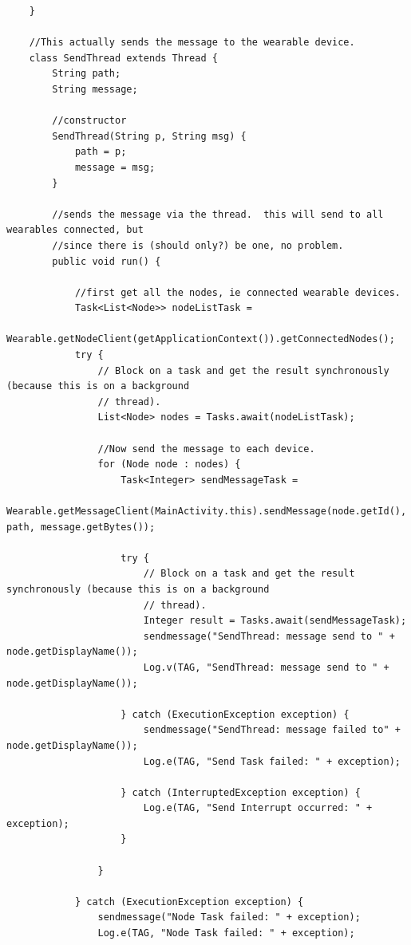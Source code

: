 \documentclass[12pt]{book}
\numberwithin{equation}{section}
\begin{document}
\begin{appendices}
\begin{verbatim}
    }

    //This actually sends the message to the wearable device.
    class SendThread extends Thread {
        String path;
        String message;

        //constructor
        SendThread(String p, String msg) {
            path = p;
            message = msg;
        }

        //sends the message via the thread.  this will send to all wearables connected, but
        //since there is (should only?) be one, no problem.
        public void run() {

            //first get all the nodes, ie connected wearable devices.
            Task<List<Node>> nodeListTask =
                    Wearable.getNodeClient(getApplicationContext()).getConnectedNodes();
            try {
                // Block on a task and get the result synchronously (because this is on a background
                // thread).
                List<Node> nodes = Tasks.await(nodeListTask);

                //Now send the message to each device.
                for (Node node : nodes) {
                    Task<Integer> sendMessageTask =
                            Wearable.getMessageClient(MainActivity.this).sendMessage(node.getId(), path, message.getBytes());

                    try {
                        // Block on a task and get the result synchronously (because this is on a background
                        // thread).
                        Integer result = Tasks.await(sendMessageTask);
                        sendmessage("SendThread: message send to " + node.getDisplayName());
                        Log.v(TAG, "SendThread: message send to " + node.getDisplayName());

                    } catch (ExecutionException exception) {
                        sendmessage("SendThread: message failed to" + node.getDisplayName());
                        Log.e(TAG, "Send Task failed: " + exception);

                    } catch (InterruptedException exception) {
                        Log.e(TAG, "Send Interrupt occurred: " + exception);
                    }

                }

            } catch (ExecutionException exception) {
                sendmessage("Node Task failed: " + exception);
                Log.e(TAG, "Node Task failed: " + exception);


\end{verbatim}
\end{appendices}
\end{document}
